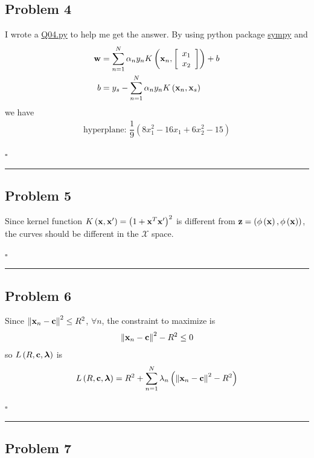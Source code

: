 \documentclass[12pt]{article}
\newcommand*{\QEDB}{\hfill\ensuremath{\square}}
\newcommand{\SBrackets}[1]{\left[#1\right]}
\newcommand{\ParTh}[1]{\left(#1\right)}
\newcommand{\BF}[1]{{\bf#1}}
\newcommand{\VecAbsVal}[1]{\left\|#1\right\|}
\newcommand{\Matrix}[2]{\SBrackets{\begin{array}{#1}#2\end{array}}}
\newcommand{\horrule}[1]{\rule{\linewidth}{#1}}
\begin{document}
\subsection*{Problem 4}

I wrote a \url{Q04.py} to help me get the answer. By using python package \url{sympy} and
\begin{align}
\BF{w}&=\sum_{n=1}^{N}\alpha_ny_nK\ParTh{\BF{x}_n,\Matrix{c}{x_1\\x_2}}+b\\
b&=y_s-\sum_{n=1}^{N}\alpha_ny_nK\ParTh{\BF{x}_n,\BF{x}_s}
\end{align}
we have
\begin{align}
\text{hyperplane: }\dfrac{1}{9}\ParTh{8x^2_1 - 16x_1 + 6x^2_2-15}
\end{align}

\QEDB

\horrule{0.5pt}

\subsection*{Problem 5}

Since kernel function $K\ParTh{\BF{x},\BF{x}^\prime}=\ParTh{1+\BF{x}^T\BF{x}^\prime}^2$ is different from $\BF{z}=\ParTh{\phi\ParTh{\BF{x}},\phi\ParTh{\BF{x}}}$, the curves should be different in the $\mathcal{X}$ space.

\QEDB

\horrule{0.5pt}

\subsection*{Problem 6}

Since $\VecAbsVal{\BF{x}_n-\BF{c}}^2\leq R^2$, $\forall n$, the constraint to maximize is
\begin{align}
\VecAbsVal{\BF{x}_n-\BF{c}}^2-R^2\leq0
\end{align}
so $L\ParTh{R,\BF{c},\bm{\lambda}}$ is
\begin{align}
L\ParTh{R,\BF{c},\bm{\lambda}}=R^2+\sum_{n=1}^{N}\lambda_n\ParTh{\VecAbsVal{\BF{x}_n-\BF{c}}^2-R^2}
\end{align}

\QEDB

\horrule{0.5pt}

\subsection*{Problem 7}
\end{document}
